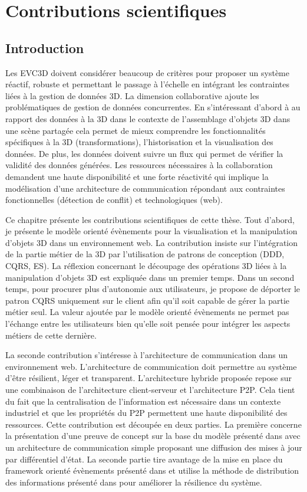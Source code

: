 \chapter{Contributions scientifiques}
\chaptertable
\section{Introduction}
Les \gls{EVC3D} doivent considérer beaucoup de critères pour 
proposer un système réactif, robuste et permettant le passage à l'échelle en 
intégrant les contraintes liées à la gestion de données 3D. La dimension 
collaborative ajoute les problématiques de gestion de données concurrentes.
En s'intéressant d'abord à au rapport des données à la 3D dans le contexte de 
l'assemblage d'objets 3D dans une scène partagée cela permet de 
mieux comprendre les fonctionnalités spécifiques à la 3D (transformations), 
l'historisation et la visualisation des données. De plus, les données 
doivent suivre un flux qui permet de vérifier la validité des données générées.
Les ressources nécessaires à la collaboration demandent une haute disponibilité 
et une forte réactivité qui implique la modélisation d'une architecture 
de communication répondant aux contraintes fonctionnelles (détection de conflit) 
et technologiques (web).

Ce chapitre présente les contributions scientifiques de cette thèse.
Tout d'abord, je présente le modèle orienté évènements pour la 
visualisation et la manipulation d'objets 3D dans un environnement web. La 
contribution insiste sur l'intégration de la partie métier de la 3D par l'utilisation de 
patrons de conception (\gls{DDD}, \gls{CQRS}, \gls{ES}). La réflexion concernant 
le découpage des opérations 3D liées à la manipulation d'objets 3D est expliquée 
dans un premier temps. Dans un second temps, pour procurer plus d'autonomie 
aux utilisateurs, je propose de déporter le patron \gls{CQRS} uniquement sur le 
client afin qu'il soit capable de gérer la partie métier seul. La valeur ajoutée par le 
modèle orienté évènements ne permet pas l'échange entre les utilisateurs bien 
qu'elle soit pensée pour intégrer les aspects métiers de cette dernière. 

La seconde contribution s'intéresse à l'architecture de 
communication dans un environnement web. L'architecture de communication doit 
permettre au système d'être résilient, léger et transparent. 
L'architecture hybride proposée repose sur une combinaison de l'architecture 
client-serveur et l'architecture P2P. 
Cela tient du fait que la centralisation de l'information est nécessaire dans un 
contexte industriel et que les propriétés du P2P permettent une haute disponibilité 
des ressources. Cette contribution est découpée en deux parties. La première 
concerne la présentation d'une preuve de concept sur la base du modèle présenté 
dans \cite{Desprat2015a} avec un architecture de communication simple 
proposant une diffusion des mises à jour par différentiel d'état. La seconde partie 
tire avantage de la mise en place du framework orienté évènements présenté dans 
\cite{Desprat2016} et utilise la méthode de distribution des informations présenté 
dans \cite{Desprat2017} pour améliorer la résilience du système. 

